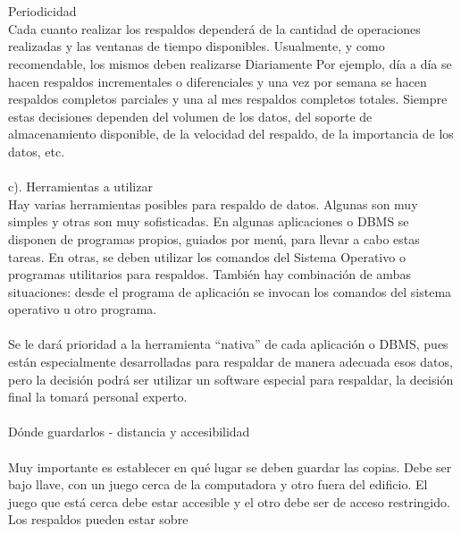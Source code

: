 \begin{enumerate}[3.1.]
\\
\\Periodicidad 
\\Cada cuanto realizar los respaldos dependerá de la cantidad de operaciones realizadas y las ventanas de tiempo disponibles. Usualmente, y como recomendable, los mismos deben realizarse Diariamente Por ejemplo, día a día se hacen respaldos incrementales o diferenciales y una vez por semana se hacen respaldos completos parciales y una al mes respaldos completos totales. Siempre estas decisiones dependen del volumen de los datos, del soporte de almacenamiento disponible, de la velocidad del respaldo, de la importancia de los datos, etc. 
\\
\\c). Herramientas a utilizar 
\\     Hay varias herramientas posibles para respaldo de datos. Algunas son muy simples y otras son muy sofisticadas. En algunas aplicaciones o DBMS se disponen de programas propios, guiados por menú, para llevar a cabo estas tareas. En otras, se deben utilizar los comandos del Sistema Operativo o programas utilitarios para respaldos. También hay combinación de ambas situaciones: desde el programa de aplicación se invocan los comandos del sistema operativo u otro programa. 
\\ 
\\     Se le dará prioridad a la herramienta “nativa” de cada aplicación o DBMS, pues están especialmente desarrolladas para respaldar de manera adecuada esos datos, pero la decisión podrá ser utilizar un software especial para respaldar, la decisión final la tomará personal experto. 
\\
\\     Dónde guardarlos - distancia y accesibilidad  
\\
\\Muy importante es establecer en qué lugar se deben guardar las copias. Debe ser bajo llave, con un juego cerca de la computadora y otro fuera del edificio. El juego que está cerca debe estar accesible y el otro debe ser de acceso restringido. Los respaldos pueden estar sobre 
\\


\end{enumerate} 
